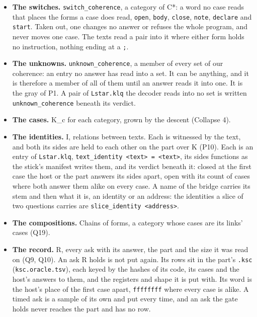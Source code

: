 \begin{itemize}
\item \textbf{The switches.} \texttt{switch\_\allowbreak{}coherence}, a category of C*: a word no case reads that places the forms a case does read, \texttt{open}, \texttt{body}, \texttt{close}, \texttt{note}, \texttt{declare} and \texttt{start}. Taken out, one changes no answer or refuses the whole program, and never moves one case. The texts read a pair into it where either form holds no instruction, nothing ending at a \texttt{;}.
\item \textbf{The unknowns.} \texttt{unknown\_\allowbreak{}coherence}, a member of every set of our coherence: an entry no answer has read into a set. It can be anything, and it is therefore a member of all of them until an answer reads it into one. It is the gray of P1. A pair of \texttt{Lstar.\allowbreak{}klq} the decoder reads into no set is written \texttt{unknown\_\allowbreak{}coherence} beneath its verdict.
\item \textbf{The cases.} K\_\allowbreak{}c for each category, grown by the descent (Collapse 4).
\item \textbf{The identities.} I, relations between texts. Each is witnessed by the text, and both its sides are held to each other on the part over K (P10). Each is an entry of \texttt{Lstar.\allowbreak{}klq}, \texttt{text\_\allowbreak{}identity <text> = <text>}, its sides functions as the stick's manifest writes them, and its verdict beneath it: closed at the first case the host or the part answers its sides apart, open with its count of cases where both answer them alike on every case. A name of the bridge carries its stem and then what it is, an identity or an address: the identities a slice of two questions carries are \texttt{slice\_\allowbreak{}identity <address>}.
\item \textbf{The compositions.} Chains of forms, a category whose cases are its links' cases (Q19).
\item \textbf{The record.} R, every ask with its answer, the part and the size it was read on (Q9, Q10). An ask R holds is not put again. Its rows sit in the part's \texttt{.\allowbreak{}ksc} (\texttt{ksc.\allowbreak{}oracle.\allowbreak{}tsv}), each keyed by the hashes of its code, its cases and the host's answers to them, and the registers and shape it is put with. Its word is the host's place of the first case apart, \texttt{ffffffff} where every case is alike. A timed ask is a sample of its own and put every time, and an ask the gate holds never reaches the part and has no row.
\end{itemize}

